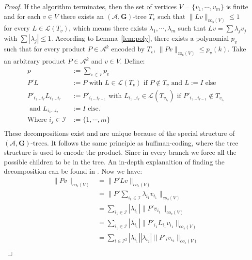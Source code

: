\begin{proof}
If the algorithm terminates, then the set of vertices $V = \{ v_1, \cdots, v_m \}$ is finite and for each $v \in V$ there exists an $(\mathcal{A},\mathbf{G})\text{-tree } T_v$ such that $\lVert Lv \rVert _{\text{co}_{\text{s}}(V)} \leq 1$ for every $L \in \mathcal{L}(T_v)$, which means there exists $\lambda_1, \cdots, \lambda_m$ such that $Lv = \sum \lambda_j v_j$ with $ \sum |\lambda_j| \leq 1 $. According to Lemma~\ref{lem:poly}, there exists a polynomial $p_v$ such that for every product $P \in \mathcal{A}^k$ encoded by $T_v$, $\lVert Pv \rVert _{\text{co}_{\text{s}}(V)} \leq p_v(k)$.
Take an arbitrary product $P \in \mathcal{A}^k$ and $v \in V$.
Define: 
$$
\begin{aligned}
  p & := \sum \limits_{v \in V} p_v \\
  P' L & := P \text{ with } L  \in  \mathcal{L}(T_v) \text{ if } P \notin T_v \text{ and } L  := I \text{ else}\\
  P'_{i_1 \dots i_r} L_{i_1 \dots i_r} & := P'_{i_1 \dots i_{r-1}} \text{ with } L_{i_1 \dots i_r} \in  \mathcal{L}(T_{v_{i_{r}}}) \text{ if } P'_{i_1 \dots i_{r-1}} \notin T_{v_{i_{r}}}\\
  \text{ and } L_{i_1 \dots i_r} & := I \text{ else.} \\
  \text{Where } i_j \in \mathcal{I} & := \{1, \cdots, m \}\\
\end{aligned}
$$
These decompositions exist and are unique because of the special structure of $(\mathcal{A},\mathbf{G})\text{-trees}$.
It follows the same principle as huffman-coding, where the tree structure is used to encode the product. Since in every branch we force all the possible children to be in the tree. An in-depth explanaition of finding the decomposition can be found in \citep{mollerTreebasedApproachJoint2014}.
\newline
Now we have:
$$
\begin{aligned}
  \|Pv\|_{co_s(V)} & = \|P'Lv\|_{co_s(V)} \\ 
  & = \|P' \sum \limits_{i_1 \in \mathcal{I}} \lambda_{i_1} v_{i_1} \|_{co_s(V)} \\ 
  & = \sum \limits_{i_1 \in \mathcal{I}} |\lambda_{i_1}| \|P'v_{i_1} \|_{co_s(V)}\\
  & = \sum \limits_{i_1 \in \mathcal{I}} |\lambda_{i_1}| \|P'_{i_1}L_{i_1}v_{i_1} \|_{co_s(V)} \\ 
  & = \sum \limits_{i \in \mathcal{I}^2} |\lambda_{i_1}| |\lambda_{i_2}| \|P'_{i}v_{i_2} \|_{co_s(V)}\\

\end{aligned}$$
\end{proof}
